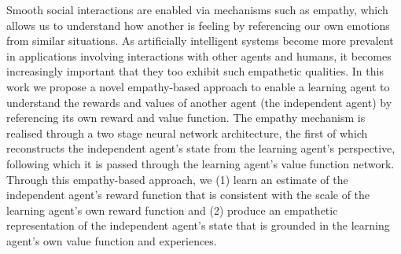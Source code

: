 \iffalse
Smooth social interactions are 
enabled via mechanisms such as empathy, which allows us to understand how another is feeling by referencing our own emotions from similar situations. 
As artificially intelligent systems become more prevalent in applications involving interactions with other agents and humans, it becomes increasingly important that they too exhibit such empathetic qualities. In this work we propose a novel empathy-based approach to enable a learning agent to understand the rewards and values of another agent (the independent agent) by referencing its own reward and value function. 
The empathy mechanism is realised through a two stage neural network architecture, the first of which reconstructs the independent agent's state from the learning agent's perspective, following which it is passed through the learning agent's value function network. 
Through this empathy-based approach, we (1) learn an estimate of the independent agent's reward function that is consistent with the scale of the learning agent's own reward function and (2) produce an empathetic representation of the independent agent's state that is grounded in the learning agent's own value function and experiences. %
